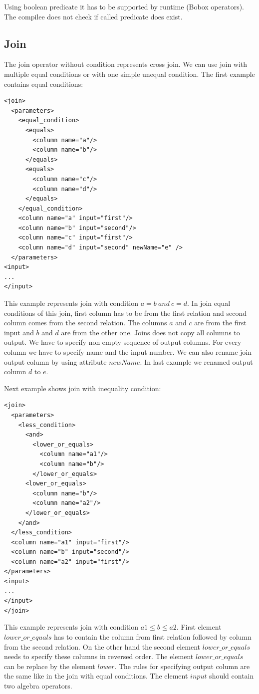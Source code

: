 Using boolean predicate it has to be supported by runtime (Bobox operators). The compilee does not check if called predicate does exist.

\subsection{Join}

The join operator without condition represents cross join. We can use join with multiple equal conditions or with one simple unequal condition. The first example contains equal conditions:

\begin{lstlisting}
<join>
  <parameters>
    <equal_condition>
      <equals>
        <column name="a"/>
        <column name="b"/>
      </equals>
      <equals>
        <column name="c"/>
        <column name="d"/>
      </equals>
    </equal_condition>
    <column name="a" input="first"/>
    <column name="b" input="second"/>
    <column name="c" input="first"/>
    <column name="d" input="second" newName="e" />
  </parameters>
<input>
...
</input>
\end{lstlisting}

This example represents join with condition $a=b~and~c=d$. In join equal conditions of this join, first column has to be from the first relation and second column comes from the second relation. The columns $a$ and $c$ are from the first input and $b$ and $d$ are from the other one. Joins does not copy all columns to output. We have to specify non empty sequence of output columns. For every column we have to specify name and the input number. We can also rename join output column by using attribute $newName$. In last example we renamed output column $d$ to $e$.

Next example shows join with inequality condition:

\begin{lstlisting}
<join>
  <parameters>
    <less_condition>
      <and>
        <lower_or_equals>
          <column name="a1"/>
          <column name="b"/>
        </lower_or_equals>
      <lower_or_equals>
        <column name="b"/>
        <column name="a2"/>
      </lower_or_equals>
    </and>
  </less_condition>
  <column name="a1" input="first"/>
  <column name="b" input="second"/>
  <column name="a2" input="first"/>
</parameters>
<input>
...
</input>
</join>
\end{lstlisting}
This example represents join with condition $a1\leq b\leq a2$. First element $lower\_or\_equals$ has to contain the column from first relation followed by column from the second relation. On the other hand the second element $lower\_or\_equals$ needs to specify these columns in reversed order. The element $lower\_or\_equals$ can be replace by the element $lower$. The rules for specifying output column are the same like in the join with equal conditions. The element $input$ should contain two algebra operators.

